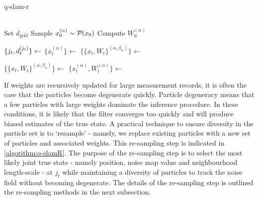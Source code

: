 \begin{algorithm}[H] %
	\caption{q-slam-r}\label{algorithm:q-slamR}
	\begin{algorithmic}[0] 
		\\
		\State Set $d_{\mathrm{grid}}$ 
		\State Sample $x_{0}^{(\alpha)} \sim \mathcal{P}_{} ( x_{0} )$ 
		\State Compute $W_0^{(\alpha)} $ 
		\EndFor
		\EndProcedure \label{pseudoalgo:qslamr:initialise}
		\EndIf
		\\
		
		\State $\{j_t, d^{( j_t )}_{t}\} \gets $
		\State $\{x_{t}^{(\alpha)}\} \gets $ 
		\State $\{\{x_t, W_t\}^{(\alpha, \beta_\alpha)}\} \gets $ 
		
		\State $\{\{x_t, W_t\}^{(\alpha, \beta_\alpha)}\} \gets $ 
		\EndIf
		\State $\{x_t^{(\alpha)}, W_t^{(\alpha)}\} \gets $ 
		\EndWhile \label{pseudoalgo:qslamr:endwhile2}			
		\EndProcedure
	\end{algorithmic}	
\end{algorithm}

If weights are recursively updated for large measurement records, it is often the case that the particles become degenerate quickly. Particle degeneracy means that a few particles with large weights dominate the inference procedure. In these conditions, it is likely that the filter converges too quickly and will produce biased estimates of the true state. A practical technique to ensure diversity in the particle set is to `resample' - namely, we replace existing particles with a new set of particles and associated weights. This re-sampling step is indicated in \cref{algorithm:q-slamR}. The purpose of the re-sampling step is to select the most likely joint true state - namely position, noise map value and neighbourhood length-scale - at $j_t$ while maintaining a diversity of particles to track the noise field without becoming degenerate. The details of the re-sampling step is outlined the re-sampling methods in the next subsection. 
